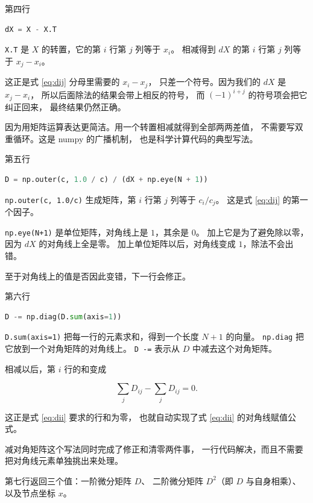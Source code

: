 第四行

\begin{lstlisting}[language=Python]
dX = X - X.T
\end{lstlisting}

\texttt{X.T} 是 $X$ 的转置，它的第 $i$ 行第 $j$ 列等于 $x_i$。
相减得到 $dX$ 的第 $i$ 行第 $j$ 列等于 $x_j-x_i$。

这正是式 \eqref{eq:dij} 分母里需要的 $x_i-x_j$，
只差一个符号。因为我们的 $dX$ 是 $x_j-x_i$，
所以后面除法的结果会带上相反的符号，
而 $(-1)^{i+j}$ 的符号项会把它纠正回来，
最终结果仍然正确。

因为用矩阵运算表达更简洁。用一个转置相减就得到全部两两差值，
不需要写双重循环。这是 numpy 的广播机制，
也是科学计算代码的典型写法。

第五行

\begin{lstlisting}[language=Python]
D = np.outer(c, 1.0 / c) / (dX + np.eye(N + 1))
\end{lstlisting}

\texttt{np.outer(c, 1.0/c)} 生成矩阵，第 $i$ 行第 $j$ 列等于 $c_i/c_j$。
这是式 \eqref{eq:dij} 的第一个因子。

\texttt{np.eye(N+1)} 是单位矩阵，对角线上是 $1$，其余是 $0$。
加上它是为了避免除以零，因为 $dX$ 的对角线上全是零。
加上单位矩阵以后，对角线变成 $1$，除法不会出错。

至于对角线上的值是否因此变错，下一行会修正。

第六行

\begin{lstlisting}[language=Python]
D -= np.diag(D.sum(axis=1))
\end{lstlisting}

\texttt{D.sum(axis=1)} 把每一行的元素求和，得到一个长度 $N+1$ 的向量。
\texttt{np.diag} 把它放到一个对角矩阵的对角线上。
\texttt{D -=} 表示从 $D$ 中减去这个对角矩阵。

相减以后，第 $i$ 行的和变成

\begin{equation}
\sum_j D_{ij} - \sum_j D_{ij} = 0 .
\end{equation}

这正是式 \eqref{eq:dii} 要求的行和为零，
也就自动实现了式 \eqref{eq:dii} 的对角线赋值公式。

减对角矩阵这个写法同时完成了修正和清零两件事，
一行代码解决，而且不需要把对角线元素单独挑出来处理。

第七行返回三个值：一阶微分矩阵 $D$、
二阶微分矩阵 $D^2$（即 $D$ 与自身相乘）、以及节点坐标 $x$。

